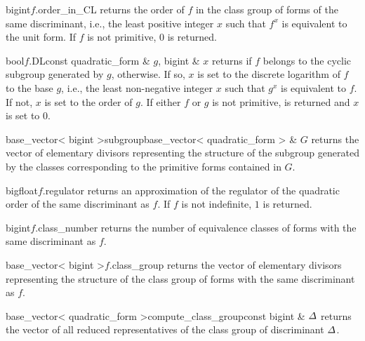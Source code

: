 

\begin{fcode}{bigint}{$f$.order_in_CL}{}
  returns the order of $f$ in the class group of forms of the same discriminant, i.e., the least
  positive integer $x$ such that $f^x$ is equivalent to the unit form.  If $f$ is not primitive,
  $0$ is returned.
\end{fcode}

\begin{cfcode}{bool}{$f$.DL}{const quadratic_form & $g$, bigint & $x$}
  returns \TRUE if $f$ belongs to the cyclic subgroup generated by $g$, \FALSE otherwise.  If
  so, $x$ is set to the discrete logarithm of $f$ to the base $g$, i.e., the least non-negative
  integer $x$ such that $g^x$ is equivalent to $f$.  If not, $x$ is set to the order of $g$.  If
  either $f$ or $g$ is not primitive, \FALSE is returned and $x$ is set to $0$.
\end{cfcode}

\begin{fcode}{base_vector< bigint >}{subgroup}{base_vector< quadratic_form > & $G$}
  returns the vector of elementary divisors representing the structure of the subgroup generated
  by the classes corresponding to the primitive forms contained in $G$.
\end{fcode}

\begin{fcode}{bigfloat}{$f$.regulator}{}
  returns an approximation of the regulator of the quadratic order of the same discriminant as
  $f$.  If $f$ is not indefinite, $1$ is returned.
\end{fcode}

\begin{fcode}{bigint}{$f$.class_number}{}
  returns the number of equivalence classes of forms with the same discriminant as $f$.
\end{fcode}

\begin{fcode}{base_vector< bigint >}{$f$.class_group}{}
  returns the vector of elementary divisors representing the structure of the class group of
  forms with the same discriminant as $f$.
\end{fcode}

\begin{fcode}{base_vector< quadratic_form >}{compute_class_group}{const bigint & $\varDelta$}
  returns the vector of all reduced representatives of the class group of discriminant $\varDelta$.
\end{fcode}

